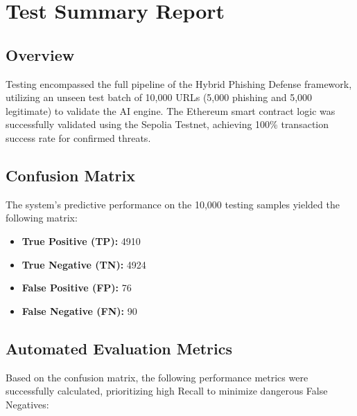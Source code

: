 \section{Test Summary Report}

\subsection{Overview}
Testing encompassed the full pipeline of the Hybrid Phishing Defense framework, utilizing an unseen test batch of 10,000 URLs (5,000 phishing and 5,000 legitimate) to validate the AI engine. The Ethereum smart contract logic was successfully validated using the Sepolia Testnet, achieving 100\% transaction success rate for confirmed threats.

\subsection{Confusion Matrix}
The system's predictive performance on the 10,000 testing samples yielded the following matrix:
\begin{itemize}
    \item \textbf{True Positive (TP):} 4910
    \item \textbf{True Negative (TN):} 4924
    \item \textbf{False Positive (FP):} 76
    \item \textbf{False Negative (FN):} 90
\end{itemize}

\subsection{Automated Evaluation Metrics}
Based on the confusion matrix, the following performance metrics were successfully calculated, prioritizing high Recall to minimize dangerous False Negatives:

